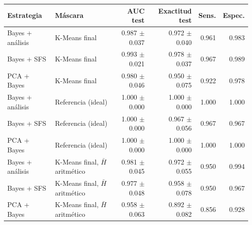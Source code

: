 \footnotesize
\begin{tabular}{llrrrr}
\toprule
Estrategia & Máscara & AUC test & Exactitud test & Sens. & Espec. \\
\midrule
Bayes + análisis & K-Means final & 0.987 $\pm$ 0.037 & 0.972 $\pm$ 0.040 & 0.961 & 0.983 \\
Bayes + SFS & K-Means final & 0.993 $\pm$ 0.021 & 0.978 $\pm$ 0.037 & 0.967 & 0.989 \\
PCA + Bayes & K-Means final & 0.980 $\pm$ 0.046 & 0.950 $\pm$ 0.075 & 0.922 & 0.978 \\
Bayes + análisis & Referencia (ideal) & 1.000 $\pm$ 0.000 & 1.000 $\pm$ 0.000 & 1.000 & 1.000 \\
Bayes + SFS & Referencia (ideal) & 1.000 $\pm$ 0.000 & 0.967 $\pm$ 0.056 & 0.967 & 0.967 \\
PCA + Bayes & Referencia (ideal) & 1.000 $\pm$ 0.000 & 1.000 $\pm$ 0.000 & 1.000 & 1.000 \\
Bayes + análisis & K-Means final, $\bar H$ aritmético & 0.981 $\pm$ 0.045 & 0.972 $\pm$ 0.055 & 0.950 & 0.994 \\
Bayes + SFS & K-Means final, $\bar H$ aritmético & 0.977 $\pm$ 0.048 & 0.958 $\pm$ 0.078 & 0.950 & 0.967 \\
PCA + Bayes & K-Means final, $\bar H$ aritmético & 0.958 $\pm$ 0.063 & 0.892 $\pm$ 0.082 & 0.856 & 0.928 \\
\bottomrule
\end{tabular}
